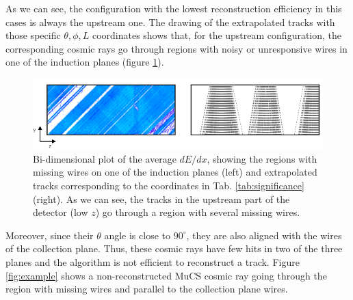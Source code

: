 \documentclass[a4paper]{scrartcl}
\begin{document}
As we can see, the configuration with the lowest reconstruction efficiency in this cases is always the upstream one. The drawing of the extrapolated tracks with those specific $\theta,\phi,L$ coordinates shows that, for the upstream configuration, the corresponding cosmic rays go through regions with noisy or unresponsive wires in one of the induction planes (figure \ref{fig:wires}).

\begin{figure}[htbp]
  \begin{center}
    \includegraphics[width=1\linewidth]{figures/wire_tracks.png}
    \caption{Bi-dimensional plot of the average $dE/dx$, showing the regions with missing wires on one of the induction planes (left) and extrapolated tracks corresponding to the coordinates in Tab. \ref{tab:significance} (right). As we can see, the tracks in the upstream part of the detector (low $z$) go through a region with several missing wires.} \label{fig:wires}
  \end{center}
\end{figure}


Moreover, since their $\theta$ angle is close to $90^\circ$, they are also aligned with the wires of the collection plane. Thus, these cosmic rays have few hits in two of the three planes and the algorithm is not efficient to reconstruct a track. Figure \ref{fig:example} shows a non-reconstructed MuCS cosmic ray going through the region with missing wires and parallel to the collection plane wires.
\end{document}
